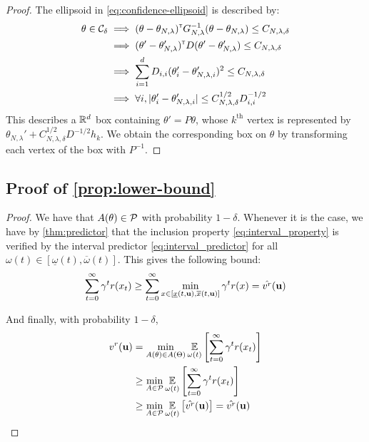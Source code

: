 \documentclass{article}
\begin{document}
\begin{proof}
The ellipsoid in \eqref{eq:confidence-ellipsoid} is described by:
\begin{align*}
    \theta\in\mathcal{C}_\delta &\implies
    (\theta-\theta_{N,\lambda})^{\mathsf{\scriptscriptstyle T}} G_{N,\lambda}^{-1}(\theta-\theta_{N,\lambda}) \leq C_{N,\lambda,\delta}\\
    &\implies (\theta'-\theta'_{N,\lambda})^{\mathsf{\scriptscriptstyle T}} D (\theta'-\theta'_{N,\lambda}) \leq C_{N,\lambda,\delta}\\
    &\implies \sum_{i=1}^d D_{i,i}(\theta'_i-\theta'_{N,\lambda,i})^2\leq C_{N,\lambda,\delta}\\
    &\implies\forall i, |\theta'_i-\theta'_{N,\lambda,i}|\leq C_{N,\lambda,\delta}^{1/2}D_{i,i}^{-1/2}
\end{align*}
This describes a $\mathbb{R}^d$ box containing $\theta' = P\theta$, whose $k^\text{th}$ vertex is represented by $\theta_{N,\lambda}' + C_{N,\lambda,\delta}^{1/2}D^{-1/2} h_k$. We obtain the corresponding box on $\theta$ by transforming each vertex of the box with $P^{-1}$.
\end{proof}

\subsection{Proof of \autoref{prop:lower-bound}}

\begin{proof}
We have that $A(\theta) \in \mathcal{P}$ with probability $1-\delta$. Whenever it is the case, we have by \autoref{thm:predictor} that the inclusion property \eqref{eq:interval_property} is verified by the interval predictor \eqref{eq:interval_predictor} for all $\omega(t)\in[\underline{\omega}(t), \overline{\omega}(t)]$. This gives the following bound:
\begin{equation*}
 \sum_{t=0}^\infty \gamma^t r(x_t) \geq \sum_{t=0}^\infty \min_{x\in[\underline{x}(t, \mathbf{u}), \overline{x}(t, \mathbf{u})]} \gamma^t r(x) = \hat{v^r}(\mathbf{u})
\end{equation*}

And finally, with probability $1-\delta$,
\begin{align*}
v^r(\mathbf{u}) &= \min_{A(\theta) \in A(\Theta)} \operatorname*{\mathbb{E}}\limits_{\omega(t)}\left[\sum_{t=0}^\infty \gamma^t r(x_t)\right] \\
&\geq \min_{A \in \mathcal{P}} \operatorname*{\mathbb{E}}\limits_{\omega(t)}\left[\sum_{t=0}^\infty \gamma^t r(x_t)\right] \\
& \geq \min_{A \in \mathcal{P}} \operatorname*{\mathbb{E}}\limits_{\omega(t)}\left[\hat{v^r}(\mathbf{u})\right] = \hat{v^r}(\mathbf{u})
\end{align*}
\end{proof}
\end{document}
